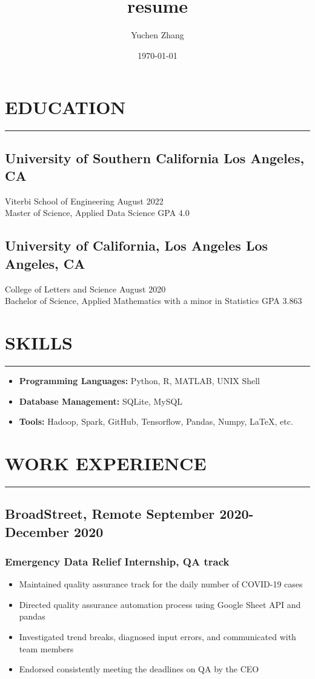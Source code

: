 \documentclass[12pt]{article}
\title{resume}
\author{Yuchen Zhang}
\date{\today}
\newcommand{\divider}{\vskip2pt\hrule\vskip2pt}
\begin{document}
	\section*{EDUCATION}
	\divider
		\subsection*{University of Southern California \hfill {\normalfont Los Angeles, CA}}
		\noindent
		Viterbi School of Engineering \hfill August 2022 \\
		Master of Science, Applied Data Science \hfill GPA 4.0 \\
		
		\subsection*{University of California, Los Angeles \hfill {\normalfont Los Angeles, CA}}
		\noindent
		College of Letters and Science \hfill August 2020 \\
		Bachelor of Science, Applied Mathematics with a minor in Statistics \hfill GPA 3.863 \\
		
	\section*{SKILLS}
	\divider
	\begin{itemize}[leftmargin=*]
		\setlength\itemsep{1pt}
		\item[] \textbf{Programming Languages:} Python, R, MATLAB, UNIX Shell
		\item[] \textbf{Database Management:} SQLite, MySQL
		\item[] \textbf{Tools:} Hadoop, Spark, GitHub, Tensorflow, Pandas, Numpy, \LaTeX, etc.
	\end{itemize}
		
	\section*{WORK EXPERIENCE}
	\divider
		\subsection*{BroadStreet{\normalfont, Remote \hfill September 2020-December 2020}}
			\subsubsection*{Emergency Data Relief Internship, QA track}
			\begin{itemize}
				\setlength\itemsep{-1pt}
				\item Maintained quality assurance track for the daily number of COVID-19 cases 
				\item Directed quality assurance automation process using Google Sheet API and pandas
				\item Investigated trend breaks, diagnosed input errors, and communicated with team members
				\item Endorsed consistently meeting the deadlines on QA by the CEO
			\end{itemize}
		
\end{document}
